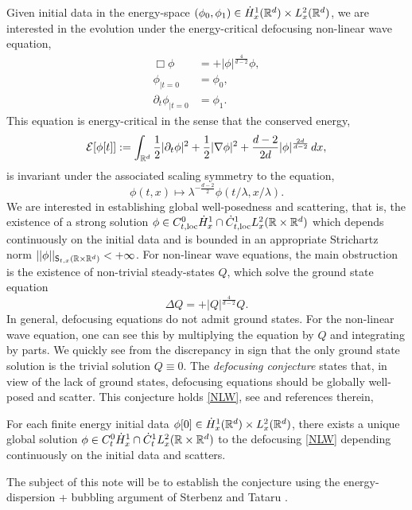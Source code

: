 Given initial data in the energy-space $(\phi_0, \phi_1) \in \dot H^1_x (\mathbb R^d) \times L^2_x (\mathbb R^d)$, we are interested in the evolution under the energy-critical defocusing non-linear wave equation, 
	\begin{equation}\label{eq:NLW}\tag{NLW}
		\begin{split}
		\Box \phi
			&= + |\phi|^{\frac{4}{d - 2}} \phi,\\
		\phi_{|t = 0}
			&= \phi_0, \\
		\partial_t \phi_{|t = 0}
			&= \phi_1.
		\end{split}			
	\end{equation}
This equation is energy-critical in the sense that the conserved energy, 
	\[
		\mathcal E [\phi[t]] := \int_{\mathbb R^d} \frac12 |\partial_t \phi|^2 + \frac12 |\nabla \phi|^2 + \frac{d - 2}{2d} |\phi|^{\frac{2d}{d - 2}} \, dx ,
	\]
is invariant under the associated scaling symmetry to the equation,
	\[
		\phi(t, x) \mapsto \lambda^{-\frac{d-2}{2}} \phi(t/\lambda, x/\lambda).
	\]
We are interested in establishing global well-posedness and scattering, that is, the existence of a strong solution $\phi \in C^0_{t, \mathrm{loc}} \dot H^1_x \cap \dot C^1_{t, \mathrm{loc}} L^2_x (\mathbb R \times \mathbb R^d)$ which depends continuously on the initial data and is bounded in an appropriate Strichartz norm $||\phi||_{\mathsf S_{t, x} (\mathbb R \times \mathbb R^d)} < + \infty$. For non-linear wave equations, the main obstruction is the existence of non-trivial steady-states $Q$, which solve the ground state equation
	\begin{equation}
		\Delta Q = + |Q|^{\frac{4}{d - 2}} Q.
		\label{eq:GS}
		\tag{GS}
	\end{equation}
In general, defocusing equations do not admit ground states. For the non-linear wave equation, one can see this by multiplying the equation by $Q$ and integrating by parts. We quickly see from the discrepancy in sign that the only ground state solution is the trivial solution $Q \equiv 0$. The \emph{defocusing conjecture} states that, in view of the lack of ground states, defocusing equations should be globally well-posed and scatter. This conjecture holds \eqref{NLW}, see \cite[Chapter 5.1]{Tao2006} and references therein,


\begin{theorem}\label{thm:defocusing}
	For each finite energy initial data $\phi[0] \in \dot H^1_x (\mathbb R^d) \times L^2_x (\mathbb R^d)$, there exists a unique global solution $\phi \in C^0_{t} \dot H^1_x \cap \dot C^1_{t} L^2_x (\mathbb R \times \mathbb R^d)$ to the defocusing \eqref{NLW} depending continuously on the initial data and scatters. 
\end{theorem}

The subject of this note will be to establish the conjecture using the energy-dispersion + bubbling argument of Sterbenz and Tataru \cite{SterbenzTataru2010a, SterbenzTataru2010}. 



